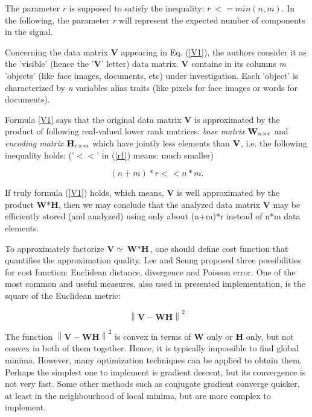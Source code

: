 \documentclass[preprint,12pt]{elsarticle}
\newcommand{\beq}{\begin{equation}}
\newcommand{\eeq}{\end{equation}}
\newcommand{\norm}[1]{\left\lVert#1\right\rVert}
\begin{document}
The parameter $r$ is supposed to satisfy the inequality: $r~<= min(n,m)$.
In the following, the parameter \emph{r} will represent the expected number of components in the signal.


Concerning the data matrix \textbf{V} appearing in Eq. (\ref{V1}), the authors \cite{lee1999learning} consider it as the 'visible' (hence the '\textbf{V}' letter) data matrix. \textbf{V} contains in its columns \textit{m} 'objects' (like face images, documents, etc) under investigation. Each 'object' is characterized by \textit{n}
variables alias traits (like pixels for face images or words for documents).

Formula \ref{V1} says  that the original data matrix \textbf{V} is
approximated by the product of following real-valued lower rank matrices: \emph{base matrix} ${\bf W}_{n\times r}$ and \emph{encoding matrix} ${\bf H}_{r\times m}$  which have jointly less elements than ${\bf V}$, i.e. the following inequality holds:
('$< <$' in (\ref{r1}) means: much smaller)

\begin{equation}\label{r1}
    (n+m)*r<\hspace{1pt}< n*m . 
\end{equation}

If truly formula (\ref{V1}) holds, which means, {\bf V} is well
approximated by the product {\bf W}*{\bf H}, then we may conclude that the
analyzed data matrix {\bf V} may be efficiently stored (and analyzed)
using only about (n+m)*r instead of n*m data elements.

To approximately factorize $\textbf{V}\simeq{\textbf{W}*\textbf{H}}$, one should define cost function that quantifies the approximation quality. Lee and Seung proposed three possibilities for cost function: Euclidean distance, divergence and Poisson error. One of the most common and useful measures, also used in presented implementation, is the square of the Euclidean metric:

\beq  
\norm{\textbf{V}-\textbf{WH}}^2
\eeq

The function $\norm{\textbf{V}-\textbf{WH}}^2$ is convex in terms of \textbf{W} only or \textbf{H} only, but not convex in both of them together. Hence, it is typically impossible to find global minima. However, many optimization techniques can be applied to obtain them.
Perhaps the simplest one to implement is gradient descent, but its convergence is not very fast. Some other methods such as conjugate gradient converge quicker, at least in the neighbourhood of local minima, but are more complex to implement.
\end{document}
